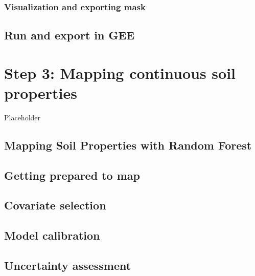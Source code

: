 \documentclass[
  10pt,
  b5paper,
  oneside]{book}
\begin{document}
\hypertarget{visualization-and-exporting-mask}{%
\subsection{Visualization and exporting mask}\label{visualization-and-exporting-mask}}

\hypertarget{run-and-export-in-gee}{%
\section{Run and export in GEE}\label{run-and-export-in-gee}}

\hypertarget{step-3-mapping-continuous-soil-properties}{%
\chapter{Step 3: Mapping continuous soil properties}\label{step-3-mapping-continuous-soil-properties}}

Placeholder

\hypertarget{mapping-soil-properties-with-random-forest}{%
\section{Mapping Soil Properties with Random Forest}\label{mapping-soil-properties-with-random-forest}}

\hypertarget{getting-prepared-to-map}{%
\section{Getting prepared to map}\label{getting-prepared-to-map}}

\hypertarget{covariate-selection}{%
\section{Covariate selection}\label{covariate-selection}}

\hypertarget{model-calibration}{%
\section{Model calibration}\label{model-calibration}}

\hypertarget{uncertainty-assessment}{%
\section{Uncertainty assessment}\label{uncertainty-assessment}}
\end{document}
